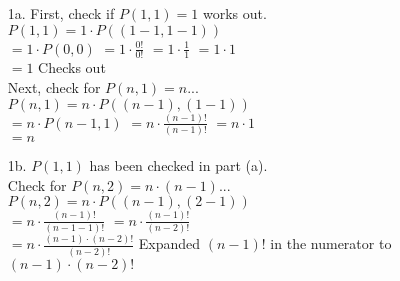 
\newcommand{\laClass}       {CS 211}
\newcommand{\laSemester}    {Spring 2018}
\newcommand{\laChapter}     {5.5}
\newcommand{\laType}        {Exercise}
\newcommand{\laPoints}      {5}
\newcommand{\laTitle}       {Recursive Counting}
\newcommand{\laDate}        {Jan 16, 2018}
\setcounter{chapter}{5}
\setcounter{section}{5}
\addtocounter{section}{-1}

\toggletrue{answerkey}





    \begin{enumerate}
        \item[1a.]      First, check if $P(1,1) = 1$ works out. \\
                        $P(1,1) = 1 \cdot P( (1-1, 1-1) )$ \\
                        $ = 1 \cdot P( 0, 0 ) $ \tab
                        $ = 1 \cdot \frac{0!}{0!} $ \tab
                        $ = 1 \cdot \frac{1}{1} $ \tab
                        $ = 1 \cdot 1 $ \\
                        $ = 1 $ \checkmark \tab Checks out \\ 

                        Next, check for $P(n, 1) = n$... \\
                        $P(n, 1) = n \cdot P( (n-1), (1-1) )$ \\
                        $ = n \cdot P( n-1, 1 ) $ \tab
                        $ = n \cdot \frac{ (n-1)! }{ (n-1)! } $ \tab
                        $ = n \cdot 1 $ \\
                        $ = n $ \checkmark
                        
        \item[1b.]      $P(1,1)$ has been checked in part (a). \\

                        Check for $P(n,2) = n \cdot (n-1)$... \\
                        $P(n,2) = n \cdot P( (n-1), (2-1) )$ \\
                        $ = n \cdot \frac{ (n-1)! }{ (n-1-1)! } $ \tab
                        $ = n \cdot \frac{ (n-1)! }{ (n-2)! } $ \\
                        $ = n \cdot \frac{ (n-1) \cdot (n-2)! }{ (n-2)! } $ \tab
                        \small 
                        Expanded $(n-1)!$ in the numerator to $(n-1) \cdot (n-2)!$
                        \normalsize


\end{enumerate}
